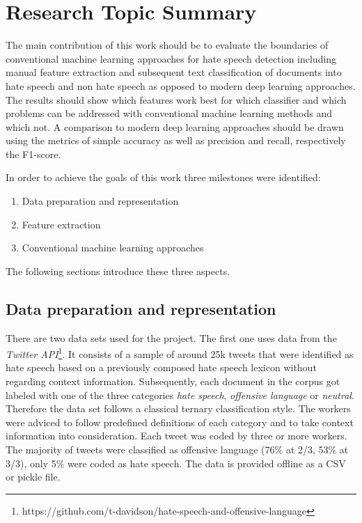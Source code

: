 \section{Research Topic Summary}

The main contribution of this work should be to evaluate the boundaries of conventional machine learning approaches for hate speech detection including manual feature extraction and subsequent text classification of documents into hate speech and non hate speech as opposed to modern deep learning approaches. The results should show which features work best for which classifier and which problems can be addressed with conventional machine learning methods and which not. A comparison to modern deep learning approaches should be drawn using the metrics of simple accuracy as well as precision and recall, respectively the F1-score. 

\noindent
In order to achieve the goals of this work three milestones were identified: 

\begin{enumerate}
	\item Data preparation and representation
	\item Feature extraction
	\item Conventional machine learning approaches
\end{enumerate}

\noindent
The following sections introduce these three aspects.

\subsection{Data preparation and representation}

There are two data sets used for the project. The first one \cite{ThomasDavidson.2020} uses data from the \textit{Twitter API}\footnote{https://github.com/t-davidson/hate-speech-and-offensive-language}. It consists of a sample of around 25k tweets that were identified as hate speech based on a previously composed hate speech lexicon without regarding context information. Subsequently, each document in the corpus got labeled with one of the three categories \textit{hate speech}, \textit{offensive language} or \textit{neutral}. Therefore the data set follows a classical ternary classification style. The workers were adviced to follow predefined definitions of each category and to take context information into consideration. Each tweet was coded by three or more workers. The majority of tweets were classified as offensive language (76\% at 2/3, 53\% at 3/3), only 5\% were coded as hate speech. The data is provided offline as a CSV or pickle file. 


